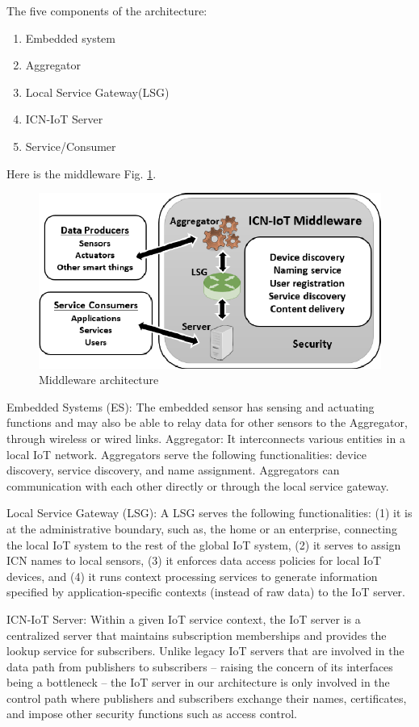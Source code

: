 The five components of the architecture:
\begin{enumerate}
\item Embedded system
\item Aggregator
\item Local Service Gateway(LSG)
\item ICN-IoT Server
\item Service/Consumer
\end{enumerate}
Here is the middleware Fig. \ref{fig:architecture}.
\begin{figure}[h]
	\centering
	\includegraphics[width=0.8\linewidth]{Figures/Architecture.png}
	\caption[]{Middleware architecture}
	\label{fig:architecture}
\end{figure}
\par
Embedded Systems (ES): The embedded sensor has sensing and actuating functions and may also be able to relay data for other sensors to the Aggregator, through wireless or wired links.
Aggregator: It interconnects various entities in a local IoT network. Aggregators serve the following functionalities: device discovery, service discovery, and name assignment. Aggregators can communication with each other directly or through the local service gateway.\par
Local Service Gateway (LSG): A LSG serves the following functionalities: (1) it is at the administrative boundary, such as, the home or an enterprise, connecting the local IoT system to the rest of the global IoT system, (2) it serves to assign ICN names to local sensors, (3) it enforces data access policies for local IoT devices, and (4) it runs context processing services to generate information specified by application-specific contexts (instead of raw data) to the IoT server.\par
ICN-IoT Server: Within a given IoT service context, the IoT server is a centralized server that maintains subscription memberships and provides the lookup service for subscribers. Unlike legacy IoT servers that are involved in the data path from publishers to subscribers -- raising the concern of its interfaces being a bottleneck -- the IoT server in our architecture is only involved in the control path where publishers and subscribers exchange their names, certificates, and impose other security functions such as access control.\par
